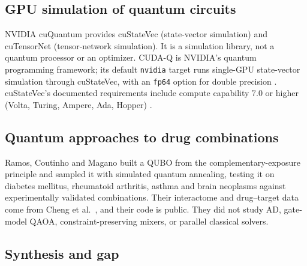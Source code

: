 \subsection{GPU simulation of quantum circuits}

NVIDIA cuQuantum \cite{bayraktar2023cuquantum} provides cuStateVec (state-vector simulation) and cuTensorNet (tensor-network simulation). It is a simulation library, not a quantum processor or an optimizer. CUDA-Q \cite{cudaq_docs} is NVIDIA's quantum programming framework; its default \texttt{nvidia} target runs single-GPU state-vector simulation through cuStateVec, with an \texttt{fp64} option for double precision \cite{cudaq_docs}. cuStateVec's documented requirements include compute capability 7.0 or higher (Volta, Turing, Ampere, Ada, Hopper) \cite{cuquantum_docs}.

\subsection{Quantum approaches to drug combinations}

Ramos, Coutinho and Magano \cite{ramos2025quantum} built a QUBO from the complementary-exposure principle and sampled it with simulated quantum annealing, testing it on diabetes mellitus, rheumatoid arthritis, asthma and brain neoplasms against experimentally validated combinations. Their interactome and drug--target data come from Cheng et al.\ \cite{cheng2019combinations}, and their code is public. They did not study AD, gate-model QAOA, constraint-preserving mixers, or parallel classical solvers.

\subsection{Synthesis and gap}

